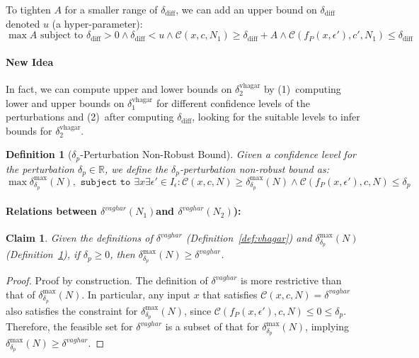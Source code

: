 \documentclass[11pt]{article}
\newtheorem{definition}{Definition}
\newtheorem{claim}{Claim}
\begin{document}
  To tighten $A$ for a smaller range of $\delta_\text{diff}$, we can add an upper bound on $\delta_\text{diff}$ denoted $u$ (a hyper-parameter):
  \begin{equation}\label{eq:ourproof}
 \max A \text{ subject to } \delta_\text{diff}>0\land \delta_\text{diff}<u\land \mathcal{C}(x,c,N_1) \geq \delta_\text{diff} + A\land \mathcal{C}(f_P(x,\epsilon'),c',N_1)\leq \delta_\text{diff}
 \end{equation}
 \paragraph{New Idea}
 In fact, we can compute upper and lower bounds on $\delta^\text{vhagar}_2$ by (1)~computing lower and upper bounds on  $\delta^\text{vhagar}_1$ for different confidence levels of the perturbations and (2)~after computing $\delta_\text{diff}$, looking for the suitable levels to infer bounds for $\delta^\text{vhagar}_2$.
 \begin{definition}[$\delta_p$-Perturbation Non-Robust Bound]\label{def:delta_u}
 Given a confidence level for the perturbation $\delta_p\in\mathbb{R}$, we define the $\delta_p$-perturbation non-robust bound as:  
\begin{equation}\label{eq:vagbound}
\max{\delta^\text{max}_{\delta_p}(N)}, \texttt{ subject to } \exists{x}\exists{\epsilon'}\in{I_\epsilon}: \mathcal{C}(x,c,N) \geq \delta^\text{max}_{\delta_p}(N) \land \mathcal{C}(f_P(x,\epsilon'),c,N)\leq \delta_p
\end{equation}
\end{definition}


\paragraph{Relations between $\delta^{vaghar}(N_1)$and $\delta^{vaghar}(N_2)$):}
\begin{claim}\label{claim:delta_u_is_bigger_delta_v}
Given the definitions of $\delta^{vaghar}$ (Definition~\ref{def:vhagar}) and $\delta^\text{max}_{\delta_p}(N)$ (Definition~\ref{def:delta_u}), if $\delta_p \geq 0$, then $\delta^\text{max}_{\delta_p}(N) \geq \delta^{vaghar}$.
\end{claim}

\begin{proof}
Proof by construction. The definition of $\delta^{vaghar}$ is more restrictive than that of $\delta^\text{max}_{\delta_p}(N)$. In particular, any input $x$ that satisfies $\mathcal{C}(x, c, N) = \delta^{vaghar}$ also satisfies the constraint for $\delta^\text{max}_{\delta_p}(N)$, since $\mathcal{C}(f_P(x, \epsilon'), c, N) \leq 0 \leq \delta_p$. Therefore, the feasible set for $\delta^{vaghar}$ is a subset of that for $\delta^\text{max}_{\delta_p}(N)$, implying $\delta^\text{max}_{\delta_p}(N) \geq \delta^{vaghar}$.
\end{proof}
\end{document}
